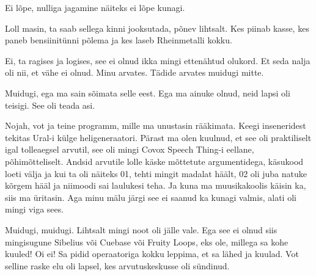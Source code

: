 
Ei lõpe, nulliga jagamine näiteks ei lõpe kunagi. 


Loll masin, ta saab sellega kinni jooksutada, põnev lihtsalt. Kes piinab kasse, 
kes  paneb bensiinitünni põlema ja kes laseb Rheinmetalli kokku.


Ei, ta ragises ja logises, see ei olnud ikka mingi ettenähtud olukord. Et seda 
nalja oli nii, et vähe ei olnud. Minu arvates. Tädide arvates muidugi mitte. 


Muidugi, ega ma sain sõimata selle eest. Ega ma ainuke olnud,  neid lapsi oli 
teisigi. See oli teada asi.

Nojah, vot ja teine programm, mille ma unustasin rääkimata. Keegi inseneridest 
tekitas Ural-i  külge heligeneraatori. Pärast ma olen kuulnud, et 
see oli praktiliselt igal tolleaegsel arvutil, see oli mingi Covox Speech 
Thing-i eellane, põhimõtteliselt. Andsid arvutile lolle käske 
mõttetute argumentidega, käsukood loeti välja ja kui ta oli näiteks 01, tehti 
mingit madalat häält, 02 oli juba natuke kõrgem hääl ja  niimoodi sai laulukesi 
teha. Ja kuna ma muusikakoolis käisin ka, siis ma üritasin. Aga minu mälu järgi 
see ei saanud ka kunagi valmis, alati oli mingi viga sees. 


Muidugi, muidugi. Lihtsalt mingi noot oli jälle vale. Ega see ei olnud siis 
mingisugune Sibelius või Cuebase või Fruity Loops, eks ole, millega sa kohe 
kuuled! Oi ei! Sa pidid   operaatoriga kokku leppima, et sa lähed ja kuulad. 
Vot selline raske elu oli lapsel, kes arvutuskeskusse oli sündinud. 

